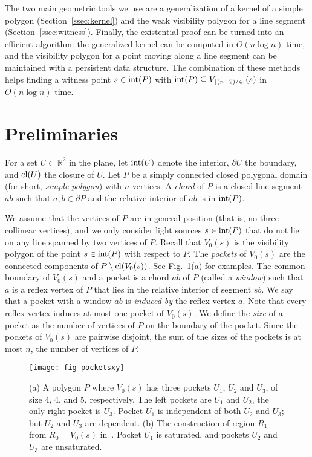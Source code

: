 \documentclass[12pt]{article}
\newcommand{\floor}[1]{{\lfloor #1 \rfloor}}
\begin{document}
The two main geometric tools we use are a generalization of a kernel of a simple polygon (Section~\ref{ssec:kernel}) and the weak visibility polygon for a line segment (Section~\ref{ssec:witness}). Finally, the existential proof can be turned into an efficient algorithm: the generalized kernel can be computed in $O(n\log n)$ time, and the visibility polygon for a point moving along a line segment can be maintained with a persistent data structure. The combination of these methods helps finding a witness point $s\in {\rm int}(P)$ with ${\rm int}(P)\subseteq V_{\floor{(n-2)/4}}(s)$  in $O(n \log n)$ time.


\section{Preliminaries}
\label{sec:prelim}


For a set $U\subset \mathbb{R}^2$ in the plane, let ${\rm int}(U)$ denote the interior, $\partial U$ the boundary, and ${\rm cl}(U)$ the closure of $U$. Let $P$ be a simply connected closed polygonal domain (for short, \emph{simple polygon}) with $n$ vertices. A \emph{chord} of $P$ is a closed line segment $ab$ such that $a,b\in \partial P$ and the relative interior of $ab$ is in ${\rm int}(P)$.

We assume that the vertices of $P$ are in general position (that is, no three collinear vertices), and we only consider light sources $s\in {\rm int}(P)$ that do not lie on any line spanned by two vertices of $P$. Recall that $V_0(s)$ is the visibility polygon of the point $s\in {\rm int}(P)$ with respect to $P$.
The \emph{pockets} of $V_0(s)$ are the connected components of $P\setminus {\rm cl}(V_0(s))$.
See Fig.~\ref{fig:pockets}(a) for examples.
The common boundary of $V_0(s)$ and a pocket is a chord $ab$ of $P$ (called a \emph{window}) such that $a$ is a reflex vertex of $P$ that lies in the relative interior of segment $sb$. We say that a pocket with a window $ab$ is \emph{induced by} the reflex vertex $a$. Note that every reflex vertex induces at most one pocket of $V_0(s)$. We define the \emph{size} of a pocket as the number of vertices of $P$ on the boundary of the pocket. Since the pockets of $V_0(s)$ are pairwise disjoint, the sum of the sizes of the pockets is at most $n$, the number of vertices of $P$.

\begin{figure}[ht]
  \centering
  \texttt{[image: fig-pocketsxy]}
  \caption{\label{fig:pockets}
(a) A polygon $P$ where $V_0(s)$ has three pockets $U_1$, $U_2$ and $U_3$,
    of size 4, 4, and 5, respectively. The left pockets are $U_1$ and $U_2$,
   the only right pocket is $U_3$. Pocket $U_1$ is independent of
   both $U_2$ and $U_3$; but $U_2$ and $U_3$ are dependent.
(b) The construction of region $R_1$ from $R_0=V_0(s)$ in~\cite{Us}.
Pocket $U_1$ is saturated, and pockets $U_2$ and $U_3$ are unsaturated.}
\end{figure}
\end{document}
